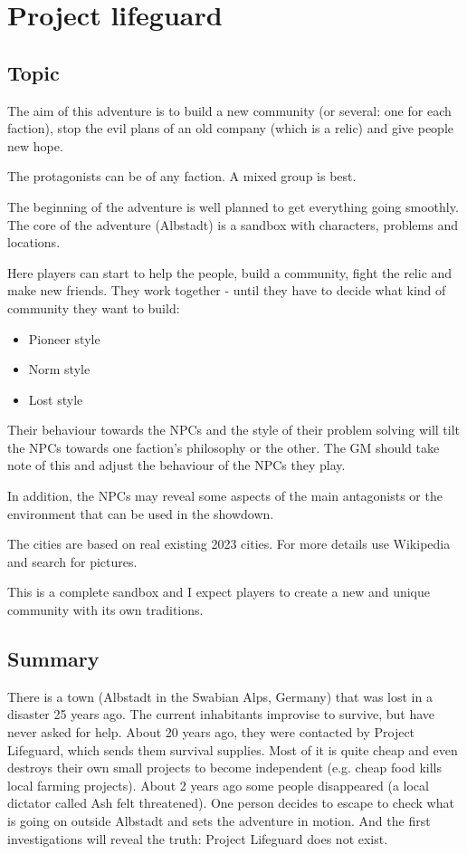 \chapter{Project lifeguard}
\label{ch:project lifeguard}

\section{Topic}

The aim of this adventure is to build a new community (or several: one for each faction), stop the evil plans of an old company (which is a relic) and give people new hope.

The protagonists can be of any faction. A mixed group is best.

The beginning of the adventure is well planned to get everything going smoothly. The core of the adventure (Albstadt) is a sandbox with characters, problems and locations.

Here players can start to help the people, build a community, fight the relic and make new friends. They work together - until they have to decide what kind of community they want to build:

\begin{itemize}
    \item Pioneer style
    \item Norm style
    \item Lost style
\end{itemize}

Their behaviour towards the NPCs and the style of their problem solving will tilt the NPCs towards one faction's philosophy or the other. The GM should take note of this and adjust the behaviour of the NPCs they play.

In addition, the NPCs may reveal some aspects of the main antagonists or the environment that can be used in the showdown.

The cities are based on real existing 2023 cities. For more details use Wikipedia and search for pictures.

This is a complete sandbox and I expect players to create a new and unique community with its own traditions.

\section{Summary}

There is a town (Albstadt in the Swabian Alps, Germany) that was lost in a disaster 25 years ago. The current inhabitants improvise to survive, but have never asked for help. About 20 years ago, they were contacted by Project Lifeguard, which sends them survival supplies. Most of it is quite cheap and even destroys their own small projects to become independent (e.g. cheap food kills local farming projects). About 2 years ago some people disappeared (a local dictator called Ash felt threatened). One person decides to escape to check what is going on outside Albstadt and sets the adventure in motion. And the first investigations will reveal the truth: Project Lifeguard does not exist.

